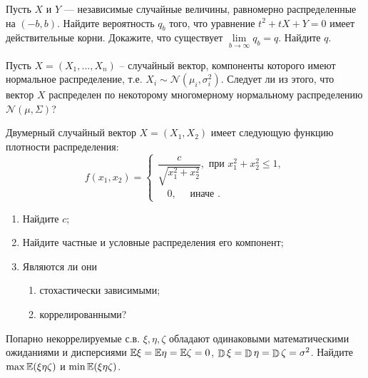 


\begin{problem}
Пусть $X$ и $Y$ --- независимые случайные величины, равномерно распределенные на $(-b,b)$. 
Найдите вероятность $q_b$ того, что уравнение $t^2+tX+Y=0$ имеет действительные корни. Докажите, что 
существует $\lim\limits_{b\to\infty} q_b=q$. Найдите $q$. 
\end{problem}


\begin{problem}
Пусть $X=(X_1,...,X_n)$ -- случайный вектор, компоненты которого имеют нормальное распределение, т.е. $X_i \sim \mathcal{N}(\mu_i,\sigma^2_i)$. Следует ли из этого, что вектор $X$ распределен по некоторому многомерному нормальному распределению $\mathcal{N}(\mu, \Sigma)$?
\end{problem}

\begin{problem}
Двумерный случайный вектор $X=(X_1,X_2)$  имеет следующую функцию плотности распределения: 
$$
f(x_1,x_2)=\begin{cases}
\dfrac{c}{\sqrt{x_1^2+x_2^2}}, \text{ при } x_1^2+x_2^2\leqslant 1 , \\
\quad 0, \quad\text{ иначе }. 
\end{cases}
$$
\begin{enumerate}
\item Найдите $c$;
\item Найдите частные и условные распределения его компонент; 
\item Являются ли они 
\begin{enumerate}
\item стохастически зависимыми; 
\item коррелированными? 
\end{enumerate}
\end{enumerate}
\end{problem}

\begin{problem}
Попарно некоррелируемые с.в. $\xi, \eta, \zeta$ обладают одинаковыми математическими ожиданиями и дисперсиями $\mathrm{{\mathbb E}}\xi = \mathrm{{\mathbb E}}\eta = \mathrm{{\mathbb E}}\zeta = 0$, $\mathop{\mathbb{D}}\nolimits\xi = \mathop{\mathbb{D}}\nolimits\eta = \mathop{\mathbb{D}}\nolimits\zeta = \sigma^2$. Найдите $\max \mathrm{{\mathbb E}}(\xi\eta\zeta)$ и $\min \mathrm{{\mathbb E}}(\xi\eta\zeta)$.
\end{problem}

